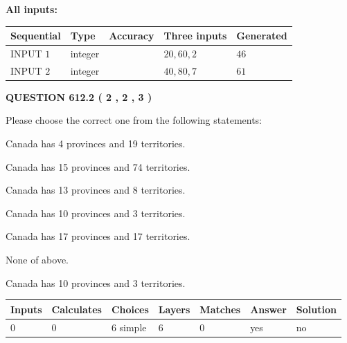 \documentclass[12pt]{article}
\begin{document}
   
   
   
\noindent\vspace{0.1in}\hspace{-0.08in} {\textbf{\Large{All inputs: }}}
   
   
  
  
\noindent\begin{tabular}{|l|l|l|l|l|}
\hline
 Sequential & Type & Accuracy & Three inputs & Generated \\ 
\hline
 
 
  INPUT $  1 $ & integer &  & $
 20
 , 
 60
 , 
 2
 $ & $ 46 $ 
 \\  \hline  
 
 
  INPUT $  2 $ & integer &  & $
 40
 , 
 80
 , 
 7
 $ & $ 61 $ 
 \\  \hline  
 \end{tabular}
   
   
  
\vspace{0.2in}
  
{\textbf{\Large{QUESTION
612.2 
 ( 2 , 2 , 3 )
}}}
  
  
Please choose the correct one from the following statements:
 
 
Canada has   4 provinces and  19 territories.
 
 
Canada has  15 provinces and  74 territories.
 
 
Canada has  13 provinces and  8 territories.
 
 
Canada has 10  provinces and 3 territories.
 
 
Canada has  17 provinces and  17 territories.
 
 
 None of above.
 
 
\noindent{}
 
 
Canada has 10  provinces and 3 territories.
 
 
\noindent{}
 
 
   
   
   
   
\noindent\begin{tabular}{|l|l|l|l|l|l|l|}
 \hline
Inputs & Calculates & Choices & Layers & Matches & Answer & Solution \\ \hline
 0  & 
 0  & 
 6
  simple  
  & 
 6  & 
 0  & 
  yes & 
  no 
  \\ \hline
 \end{tabular}
   
\end{document}
